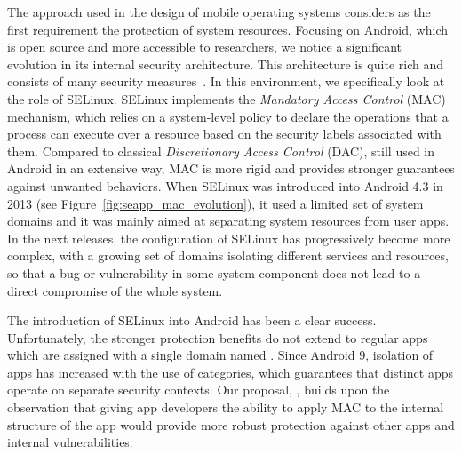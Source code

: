 The approach used in the design of mobile operating systems considers
as the first requirement the protection of system resources.  Focusing
on Android, which is open source and more accessible to researchers,
we notice a significant evolution in its internal security
architecture.  This architecture is quite rich and consists of many
security measures~\cite{seapp_10.1145/2046707.2046779,seapp_tapsm_m}.
In this environment, we specifically look at the role of SELinux.
SELinux implements the {\em Mandatory Access Control} (MAC) mechanism,
which relies on a system-level policy to declare the operations that a
process can execute over a resource based on the security labels
associated with them.  Compared to classical {\em Discretionary Access
  Control} (DAC), still used in Android in an extensive way, MAC is
more rigid and provides stronger guarantees against unwanted
behaviors.  When SELinux was introduced into Android 4.3 in 2013 (see
Figure~\ref{fig:seapp_mac_evolution}), it used a limited set of system
domains and it was mainly aimed at separating system resources from
user apps.  In the next releases, the configuration of SELinux has
progressively become more complex, with a growing set of domains
isolating different services and resources, so that a bug or
vulnerability in some system component does not lead to a direct
compromise of the whole system.

The introduction of SELinux into Android has been a clear success.
Unfortunately, the stronger protection benefits do not extend to
regular apps which are assigned with a single domain named
\untrustedapp.  Since Android 9, isolation of apps has increased with
the use of categories, which guarantees that distinct apps operate on
separate security contexts.  Our proposal, \seapp, builds upon the
observation that giving app developers the ability to apply MAC to the
internal structure of the app would provide more robust protection
against other apps and internal vulnerabilities.

